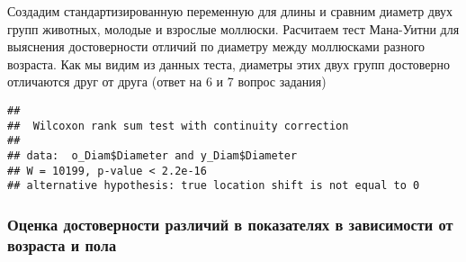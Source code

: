 \documentclass[]{article}
\newenvironment{Shaded}{\begin{snugshade}}{\end{snugshade}}
\newcommand{\CommentTok}[1]{\textcolor[rgb]{0.56,0.35,0.01}{\textit{#1}}}
\newcommand{\DataTypeTok}[1]{\textcolor[rgb]{0.13,0.29,0.53}{#1}}
\newcommand{\DecValTok}[1]{\textcolor[rgb]{0.00,0.00,0.81}{#1}}
\newcommand{\KeywordTok}[1]{\textcolor[rgb]{0.13,0.29,0.53}{\textbf{#1}}}
\newcommand{\NormalTok}[1]{#1}
\newcommand{\OperatorTok}[1]{\textcolor[rgb]{0.81,0.36,0.00}{\textbf{#1}}}
\newcommand{\OtherTok}[1]{\textcolor[rgb]{0.56,0.35,0.01}{#1}}
\newcommand{\StringTok}[1]{\textcolor[rgb]{0.31,0.60,0.02}{#1}}
\begin{document}
Создадим стандартизированную переменную для длины и сравним диаметр двух
групп животных, молодые и взрослые моллюски. Расчитаем тест Мана-Уитни
для выяснения достоверности отличий по диаметру между моллюсками разного
возраста. Как мы видим из данных теста, диаметры этих двух групп
достоверно отличаются друг от друга (ответ на 6 и 7 вопрос задания)

\begin{Shaded}
\end{Shaded}

\begin{verbatim}
## 
##  Wilcoxon rank sum test with continuity correction
## 
## data:  o_Diam$Diameter and y_Diam$Diameter
## W = 10199, p-value < 2.2e-16
## alternative hypothesis: true location shift is not equal to 0
\end{verbatim}

\hypertarget{ux43eux446ux435ux43dux43aux430-ux434ux43eux441ux442ux43eux432ux435ux440ux43dux43eux441ux442ux438-ux440ux430ux437ux43bux438ux447ux438ux439-ux432-ux43fux43eux43aux430ux437ux430ux442ux435ux43bux44fux445-ux432-ux437ux430ux432ux438ux441ux438ux43cux43eux441ux442ux438-ux43eux442-ux432ux43eux437ux440ux430ux441ux442ux430-ux438-ux43fux43eux43bux430}{%
\subsubsection{Оценка достоверности различий в показателях в зависимости
от возраста и
пола}\label{ux43eux446ux435ux43dux43aux430-ux434ux43eux441ux442ux43eux432ux435ux440ux43dux43eux441ux442ux438-ux440ux430ux437ux43bux438ux447ux438ux439-ux432-ux43fux43eux43aux430ux437ux430ux442ux435ux43bux44fux445-ux432-ux437ux430ux432ux438ux441ux438ux43cux43eux441ux442ux438-ux43eux442-ux432ux43eux437ux440ux430ux441ux442ux430-ux438-ux43fux43eux43bux430}}
\end{document}
